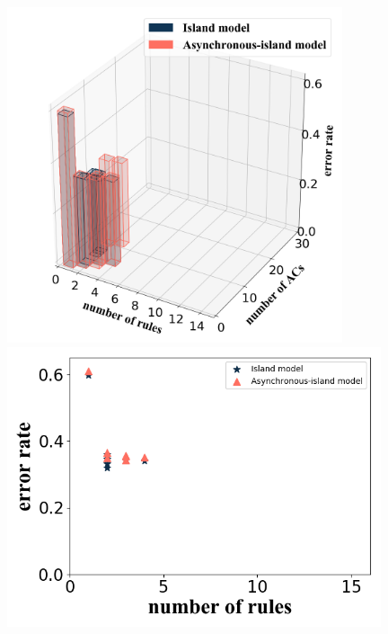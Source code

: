 \documentclass[conference]{IEEEtran}
\begin{document}
\begin{figure}[H]
    \centering
    \begin{minipage}[t]{0.40\textwidth}
    \includegraphics[width=0.88\textwidth]{figures/diffModelTrain1.png}
    \end{minipage}
    \centering
    \begin{minipage}[t]{0.25\textwidth}
    \includegraphics[width=0.98\textwidth]{figures/diffModelTrain2.png}
    \end{minipage}%
    \centering

\end{figure}
\end{document}
